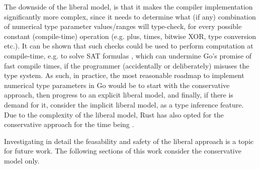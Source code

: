 
The downside of the liberal model, is that it makes the compiler implementation
significantly more complex, since it needs to determine what (if any)
combination of numerical type parameter values/ranges will type-check, for every
possible constant (compile-time) operation (e.g. plus, times, bitwise XOR, type
conversion etc.).
It can be shown that such checks could be used to perform computation at
compile-time, e.g. to solve SAT formulas \autocite{goArraySAT}, which can
undermine Go's promise of fast compile times, if the programmer (accidentally or
deliberately) misuses the type system. As such, in practice, the most reasonable
roadmap to implement numerical type parameters in Go would be to start with the
conservative approach, then progress to an explicit liberal model, and finally,
if there is demand for it, consider the implicit liberal model, as a type
inference feature. Due to the complexity of the liberal model, Rust has also
opted for the conservative approach for the time being \autocite{rustConstBlog}.

Investigating in detail the feasability and safety of the liberal approach
is a topic for future work. The following sections of this work consider the
conservative model only.






